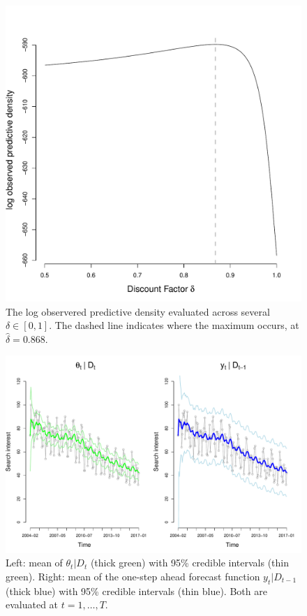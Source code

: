 \documentclass[12pt]{article}
\begin{document}
\begin{figure}[H]
\begin{center}
\includegraphics[scale=0.32]{figs/discount.pdf}
\end{center}
\caption{The log observered predictive density evaluated across several $\delta\in[0,1]$. The dashed line indicates where the maximum occurs, at $\hat{\delta}=0.868$.}
\end{figure}

\begin{figure}[H]
\begin{center}
\includegraphics[scale=0.32]{figs/current.pdf}
\end{center}
\caption{Left: mean of $\theta_t|D_t$ (thick green) with 95\% credible intervals (thin green). Right: mean of the one-step ahead forecast function $y_t|D_{t-1}$ (thick blue) with 95\% credible intervals (thin blue). Both are evaluated at $t=1,\ldots,T$.}
\end{figure}
\end{document}
